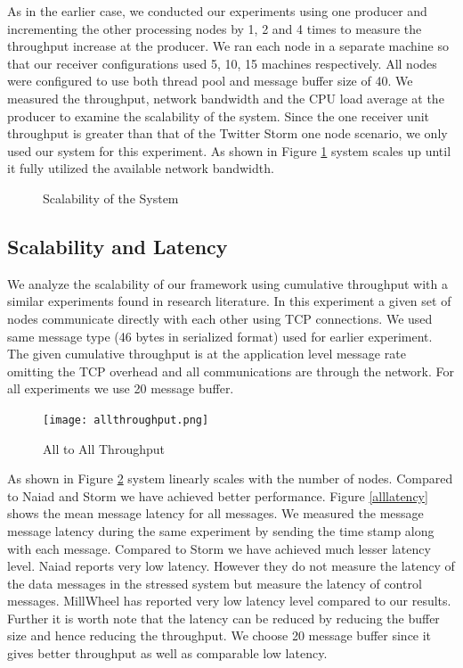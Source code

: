 As in the earlier case, we conducted our experiments using one producer and incrementing the other processing nodes by 1, 2 and 4 times to measure the throughput increase at the producer. We ran each node in a separate machine so that our receiver configurations used 5, 10, 15 machines respectively. All nodes were configured to use both thread pool and message buffer size of 40. We measured the throughput, network bandwidth and the CPU load average at the producer to examine the scalability of the system. Since the one receiver unit throughput is greater than that of the Twitter Storm one node scenario, we only used our system for this experiment. As shown in Figure \ref{scalability} system scales up until it fully utilized the available network bandwidth.
 
\begin{figure}[!t]
        \centering
        \hfil
        \hfil
        \hfil
        \caption{Scalability of the System}
        \label{scalability}
\end{figure}

\subsection{Scalability and Latency}
We analyze the scalability of our framework using cumulative throughput with a similar experiments found in research literature.  In this experiment a given set of nodes communicate directly with each other using TCP connections.  We used same message type (46 bytes in serialized format) used for earlier experiment. The given cumulative throughput is at the application level message rate omitting the TCP overhead and all communications are through the network. For all experiments we use 20 message buffer. 

\begin{figure}[!t]
        \centering
        \texttt{[image: allthroughput.png]}
        \caption{All to All Throughput}
        \label{allthroughput}
\end{figure}

As shown in Figure \ref{allthroughput} system linearly scales with the number of nodes.  Compared to Naiad and Storm we have achieved better performance.  Figure \ref{alllatency} shows the mean message latency for all messages. We measured the message message latency during the same experiment by sending the time stamp along with each message. Compared to Storm we have achieved much lesser latency level. Naiad reports very low latency. However they do not measure the latency of the data messages in the stressed system but measure the latency of control messages.  MillWheel has reported very low latency level compared to our results. Further it is worth note that the latency can be reduced by reducing the buffer size and hence reducing the throughput. We choose 20 message buffer since it gives better throughput as well as comparable low latency.

